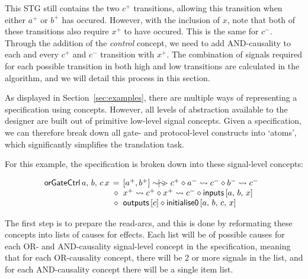 \documentclass[british,conference,compsoc]{IEEEtran}
\begin{document}
This STG still contains the two $c^{+}$ transitions, allowing this transition when either 
$a^{+}$ or $b^{+}$ has occured. However, with the inclusion of $x$, note that both
of these transitions also require $x^{+}$ to have occured. This is the same for $c^{-}$. 
Through the addition of the \emph{control} concept, we need to add AND-causality to
each and every $c^{+}$ and $c^{-}$ transition with $x^{+}$. The combination of signals
required for each possible transition in both high and low transitions are calculated in the
algorithm, and we will detail this process in this section.

As displayed in Section~\ref{sec:examples}, there are multiple ways of
representing a specification using concepts. However, all levels of
abstraction available to the designer are built out of primitive low-level
signal concepts. Given a specification, we can therefore
break down all gate- and protocol-level constructs into `atoms', which
significantly simplifies the translation task.

For this example, the specification is broken down into these signal-level concepts:

\[
\begin{array}{lcl}
\hspace{-2mm}\mathsf{orGateCtrl}\,a,\,b,\,c\,x&\hspace{-2mm}=&\hspace{-2mm}[a^{+}, b^{+}]\sim\hspace{-1.5mm}|\hspace{-1.5mm}\sim\hspace{-1.5mm}>c^{+} 
\diamond a^{-}\rightsquigarrow c^{-} \diamond b^{-}\rightsquigarrow c^{-}\\
~&\hspace{-2mm}\diamond&\hspace{-2mm}x^{+}\rightsquigarrow c^{+} \diamond
x^{+}\rightsquigarrow c^{-} \diamond \mathsf{inputs} \, [a,\,b,\,x] \\
~&\hspace{-2mm}\diamond&\hspace{-2mm}\mathsf{outputs}\,[c]\diamond\mathsf{initialise0}\,[a,\,b,\,c,\,x]
\end{array}
\]

\noindent The first step is to prepare the read-arcs, and this is done by
reformating these concepts into lists of causes for effects.
Each list will be of possible causes for each OR- and AND-causality signal-level
concept in the specification, meaning that for each OR-causality concept, there will
be 2 or more signals in the list, and for each AND-causality concept there will be a single
item list. 
\end{document}
